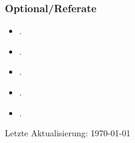 \documentclass[abstract=on,parskip=full,headings=standardclasses,fontsize=11pt,paper=a4]{scrartcl}
\begin{document}
\subsubsection*{Optional/Referate}
\begin{itemize}
\item {}.
\item {}.
\item {}.
\item {}.
\item {}.
\end{itemize}





\sloppy
\renewcommand*{\bibfont}{\small}

\setlength{\bibitemsep}{0.2em} %
\printbibliography

\bigskip

\begin{center}
Letzte Aktualisierung: \today
\end{center}
\end{document}
